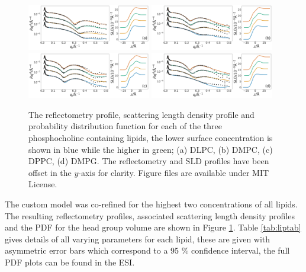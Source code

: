 \documentclass[twoside,twocolumn,9pt]{article}
\begin{document}
\begin{figure}
	\centering
	\includegraphics[width=0.48\textwidth]{figures/DLPC_all_data}
	\includegraphics[width=0.48\textwidth]{figures/DMPC_all_data}
	\includegraphics[width=0.48\textwidth]{figures/DPPC_all_data}
	\includegraphics[width=0.48\textwidth]{figures/DMPG_all_data}
	\caption{The reflectometry profile, scattering length density profile and probability distribution function for each of the three phosphocholine containing lipids, the lower surface concentration is shown in blue while the higher in green; (a) DLPC, (b) DMPC, (c) DPPC, (d) DMPG. The reflectometry and SLD profiles have been offset in the $y$-axis for clarity. Figure files are available under MIT License.\cite{mccluskey_2018}}
	\label{fig:lipids}
\end{figure}
The custom model was co-refined for the highest two concentrations of all lipids. The resulting reflectometry profiles, associated scattering length density profiles and the PDF for the head group volume are shown in Figure \ref{fig:lipids}. Table \ref{tab:liptab} gives details of all varying parameters for each lipid, these are given with asymmetric error bars which correspond to a 95 \% confidence interval, the full PDF plots can be found in the ESI. 
\end{document}
